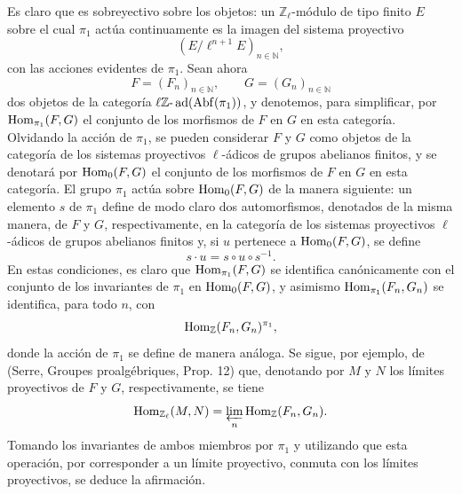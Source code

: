 \begin{prooftext}[Demostración]
Es claro que es sobreyectivo sobre los objetos: un \(\mathbb Z_\ell\)-módulo de tipo finito \(E\) sobre el cual \(\pi_1\) actúa continuamente es la imagen del sistema proyectivo
\[
(E/\ell^{n+1}E)_{n\in\mathbb N},
\]
con las acciones evidentes de \(\pi_1\). Sean ahora
\[
F=(F_n)_{n\in\mathbb N},\qquad G=(G_n)_{n\in\mathbb N}
\]
dos objetos de la categoría \(\ell\mathbb Z\text{-}\operatorname{ad}(\operatorname{Abf}(\pi_1))\), y denotemos, para simplificar, por \(\operatorname{Hom}_{\pi_1}(F,G)\) el conjunto de los morfismos de \(F\) en \(G\) en esta categoría. Olvidando la acción de \(\pi_1\), se pueden considerar \(F\) y \(G\) como objetos de la categoría de los sistemas proyectivos \(\ell\)-ádicos de grupos abelianos finitos, y se denotará por \(\operatorname{Hom}_0(F,G)\) el conjunto de los morfismos de \(F\) en \(G\) en esta categoría. El grupo \(\pi_1\) actúa sobre \(\operatorname{Hom}_0(F,G)\) de la manera siguiente: un elemento \(s\) de \(\pi_1\) define de modo claro dos automorfismos, denotados de la misma manera, de \(F\) y \(G\), respectivamente, en la categoría de los sistemas proyectivos \(\ell\)-ádicos de grupos abelianos finitos y, si \(u\) pertenece a \(\operatorname{Hom}_0(F,G)\), se define
\[
s\cdot u=s\circ u\circ s^{-1}.
\]
En estas condiciones, es claro que \(\operatorname{Hom}_{\pi_1}(F,G)\) se identifica canónicamente con el conjunto de los invariantes de \(\pi_1\) en \(\operatorname{Hom}_0(F,G)\), y asimismo \(\operatorname{Hom}_{\pi_1}(F_n,G_n)\) se identifica, para todo \(n\), con
\[
\operatorname{Hom}_{\mathbb Z}(F_n,G_n)^{\pi_1},
\]
donde la acción de \(\pi_1\) se define de manera análoga. Se sigue, por ejemplo, de (Serre, Groupes proalgébriques, Prop. 12) que, denotando por \(M\) y \(N\) los límites proyectivos de \(F\) y \(G\), respectivamente, se tiene
\[
\operatorname{Hom}_{\mathbb Z_\ell}(M,N)=\varprojlim_n\operatorname{Hom}_{\mathbb Z}(F_n,G_n).
\]
Tomando los invariantes de ambos miembros por \(\pi_1\) y utilizando que esta operación, por corresponder a un límite proyectivo, conmuta con los límites proyectivos, se deduce la afirmación.
\end{prooftext}
